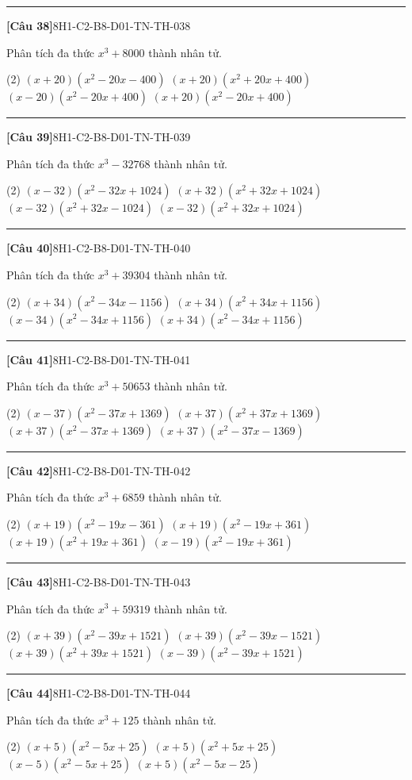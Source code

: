 \documentclass[12pt,a4paper]{article}
\newif\ifloigiai
\newenvironment{cauhoi}[2]{%
  \par\medskip\noindent\rule{\textwidth}{0.4pt}\par\nopagebreak
  \noindent\textbf{[#1]}\hfill{\scriptsize\ttfamily #2}\par\nopagebreak\smallskip}{\par}
\newcommand{\dapan}[1]{\ifloigiai\par\smallskip\noindent\textit{Đáp án:} \textbf{#1}\par\fi}
\begin{document}
\begin{cauhoi}{Câu 38}{8H1-C2-B8-D01-TN-TH-038}
Phân tích đa thức $x^{3}+8000$ thành nhân tử.
\begin{tasks}(2)
\task $(x+20)(x^{2}-20x-400)$
\task $(x+20)(x^{2}+20x+400)$
\task $(x-20)(x^{2}-20x+400)$
\task $(x+20)(x^{2}-20x+400)$
\end{tasks}
\dapan{D}
\end{cauhoi}
\begin{cauhoi}{Câu 39}{8H1-C2-B8-D01-TN-TH-039}
Phân tích đa thức $x^{3}-32768$ thành nhân tử.
\begin{tasks}(2)
\task $(x-32)(x^{2}-32x+1024)$
\task $(x+32)(x^{2}+32x+1024)$
\task $(x-32)(x^{2}+32x-1024)$
\task $(x-32)(x^{2}+32x+1024)$
\end{tasks}
\dapan{D}
\end{cauhoi}
\begin{cauhoi}{Câu 40}{8H1-C2-B8-D01-TN-TH-040}
Phân tích đa thức $x^{3}+39304$ thành nhân tử.
\begin{tasks}(2)
\task $(x+34)(x^{2}-34x-1156)$
\task $(x+34)(x^{2}+34x+1156)$
\task $(x-34)(x^{2}-34x+1156)$
\task $(x+34)(x^{2}-34x+1156)$
\end{tasks}
\dapan{D}
\end{cauhoi}
\begin{cauhoi}{Câu 41}{8H1-C2-B8-D01-TN-TH-041}
Phân tích đa thức $x^{3}+50653$ thành nhân tử.
\begin{tasks}(2)
\task $(x-37)(x^{2}-37x+1369)$
\task $(x+37)(x^{2}+37x+1369)$
\task $(x+37)(x^{2}-37x+1369)$
\task $(x+37)(x^{2}-37x-1369)$
\end{tasks}
\dapan{C}
\end{cauhoi}
\begin{cauhoi}{Câu 42}{8H1-C2-B8-D01-TN-TH-042}
Phân tích đa thức $x^{3}+6859$ thành nhân tử.
\begin{tasks}(2)
\task $(x+19)(x^{2}-19x-361)$
\task $(x+19)(x^{2}-19x+361)$
\task $(x+19)(x^{2}+19x+361)$
\task $(x-19)(x^{2}-19x+361)$
\end{tasks}
\dapan{B}
\end{cauhoi}
\begin{cauhoi}{Câu 43}{8H1-C2-B8-D01-TN-TH-043}
Phân tích đa thức $x^{3}+59319$ thành nhân tử.
\begin{tasks}(2)
\task $(x+39)(x^{2}-39x+1521)$
\task $(x+39)(x^{2}-39x-1521)$
\task $(x+39)(x^{2}+39x+1521)$
\task $(x-39)(x^{2}-39x+1521)$
\end{tasks}
\dapan{A}
\end{cauhoi}
\begin{cauhoi}{Câu 44}{8H1-C2-B8-D01-TN-TH-044}
Phân tích đa thức $x^{3}+125$ thành nhân tử.
\begin{tasks}(2)
\task $(x+5)(x^{2}-5x+25)$
\task $(x+5)(x^{2}+5x+25)$
\task $(x-5)(x^{2}-5x+25)$
\task $(x+5)(x^{2}-5x-25)$
\end{tasks}
\dapan{A}
\end{cauhoi}
\end{document}
